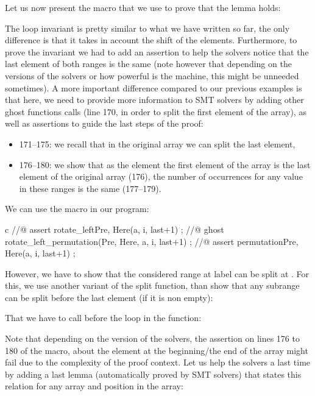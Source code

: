 Let us now present the macro that we use to prove that the lemma holds:




The loop invariant is pretty similar to what we have written so far, the only
difference is that it takes in account the shift of the elements. Furthermore,
to prove the invariant we had to add an assertion to help the solvers notice
that the last element of both ranges is the same (note however that depending
on the versions of the solvers or how powerful is the machine, this might be
unneeded sometimes). A more important difference compared to our previous
examples is that here, we need to provide more information to SMT solvers by
adding other ghost functions calls (line 170, in order to split the first
element of the array), as well as assertions to guide the last steps of the
proof:


\begin{itemize}
\item 171--175: we recall that in the original array we can split the last
  element,
\item 176--180: we show that as the element the first element of the array is
  the last element of the original array (176), the number of occurrences for
  any value in these ranges is the same (177--179).
\end{itemize}


We can use the macro in our program:


\begin{CodeBlock}{c}
//@ assert rotate_left{Pre, Here}(a, i, last+1) ;
//@ ghost rotate_left_permutation(Pre, Here, a, i, last+1) ;
//@ assert permutation{Pre, Here}(a, i, last+1) ;
\end{CodeBlock}


However, we have to show that the considered range at label  can
be split at . For this, we use another variant of the split
function, than show that any subrange can be split before the last element (if
it is non empty):






That we have to call before the loop in the  function:




Note that depending on the version of the solvers, the assertion on lines 176 to
180 of the macro, about the element at the beginning/the end of the array might
fail due to the complexity of the proof context. Let us help the solvers a last
time by adding a last lemma (automatically proved by SMT solvers) that states
this relation for any array and position in the array:



